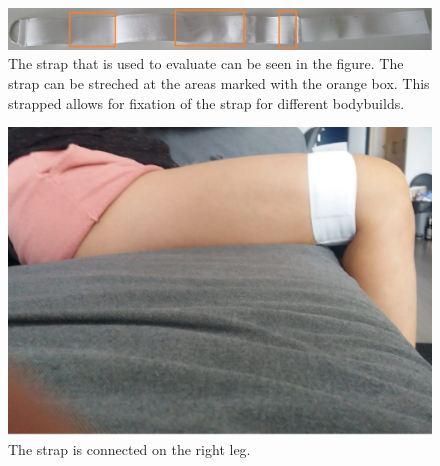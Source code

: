 \documentclass[whitelogo]{tudelft-report}
\begin{document}
{{{{\begin{figure}[htb]
	\centering\includegraphics[width=460pt]{strapv2.jpg}
	\caption{The strap that is used to evaluate can be seen in the figure. The strap can be streched at the areas marked with the orange box. This strapped allows for fixation of the strap for different bodybuilds.}
\end{figure}
\begin{figure}[H]
	\centering\includegraphics[width=460pt]{strapv2_on_leg.jpeg}
	\caption{The strap is connected on the right leg.}
\end{figure}
}}}}
\end{document}
